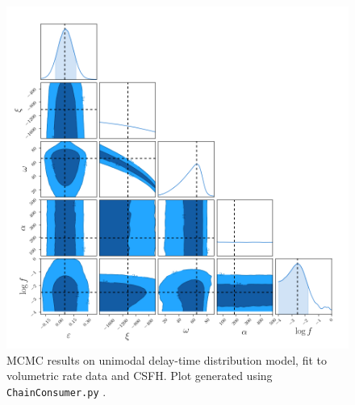 \documentclass[apj]{aastex}
\begin{document}
\begin{figure}[t] %
   \centering
   \includegraphics[width=6.5in]{figure_sfd_corners} 
   \caption{\footnotesize MCMC results on unimodal delay-time distribution model, fit to volumetric rate data and CSFH. Plot generated using {\tt ChainConsumer.py} \citep{Hinton:2016qy}.}
   \label{fig:mcmc_sfd}
\end{figure}
\clearpage
\end{document}
